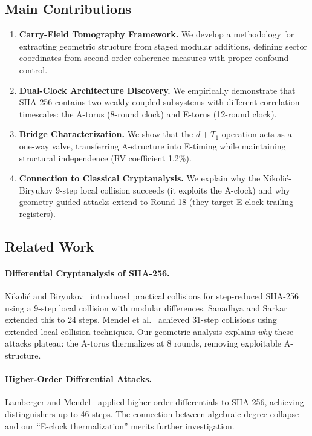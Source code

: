 \documentclass[11pt,a4paper]{article}
\theoremstyle{plain}
\theoremstyle{definition}
\theoremstyle{remark}
\begin{document}
\subsection{Main Contributions}

\begin{enumerate}
    \item \textbf{Carry-Field Tomography Framework.} We develop a methodology for extracting geometric structure from staged modular additions, defining sector coordinates from second-order coherence measures with proper confound control.
    
    \item \textbf{Dual-Clock Architecture Discovery.} We empirically demonstrate that SHA-256 contains two weakly-coupled subsystems with different correlation timescales: the A-torus (8-round clock) and E-torus (12-round clock).
    
    \item \textbf{Bridge Characterization.} We show that the $d + T_1$ operation acts as a one-way valve, transferring A-structure into E-timing while maintaining structural independence (RV coefficient 1.2\%).
    
    \item \textbf{Connection to Classical Cryptanalysis.} We explain why the Nikoli\'{c}-Biryukov 9-step local collision succeeds (it exploits the A-clock) and why geometry-guided attacks extend to Round 18 (they target E-clock trailing registers).
\end{enumerate}

\subsection{Related Work}

\paragraph{Differential Cryptanalysis of SHA-256.}
Nikoli\'{c} and Biryukov~\cite{nikolic2008} introduced practical collisions for step-reduced SHA-256 using a 9-step local collision with modular differences. Sanadhya and Sarkar~\cite{sanadhya2008} extended this to 24 steps. Mendel et al.~\cite{mendel2013} achieved 31-step collisions using extended local collision techniques. Our geometric analysis explains \emph{why} these attacks plateau: the A-torus thermalizes at 8 rounds, removing exploitable A-structure.

\paragraph{Higher-Order Differential Attacks.}
Lamberger and Mendel~\cite{lamberger2011} applied higher-order differentials to SHA-256, achieving distinguishers up to 46 steps. The connection between algebraic degree collapse and our ``E-clock thermalization'' merits further investigation.
\end{document}
